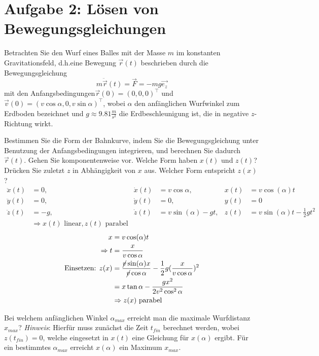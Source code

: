 \section*{Aufgabe 2:  Lösen von Bewegungsgleichungen}
Betrachten Sie den Wurf eines Balles mit der Masse $m$ im konstanten Gravitationsfeld, d.h.eine Bewegung $\overrightarrow{r}(t)$ beschrieben durch die Bewegungsgleichung \[m\ddot{\overrightarrow{r}}(t) = \overrightarrow{F} = -mg\overrightarrow{e_z}\] mit den Anfangsbedingungen$\overrightarrow{r}(0) = (0,0,0)^\top$ und $\overrightarrow{v}(0) = (v\cos\alpha,0,v\sin\alpha)^\top$, wobei $\alpha$ den anfänglichen Wurfwinkel zum Erdboden bezeichnet und $g\approx9.81\frac{m}{s^2}$ die Erdbeschleunigung ist, die in negative $z$-Richtung wirkt.
\begin{enumeralph}
	\item Bestimmen Sie die Form der Bahnkurve, indem Sie die Bewegungsgleichung unter Benutzung der Anfangsbedingungen integrieren, und berechnen Sie dadurch $\overrightarrow{r}(t)$.  Gehen Sie komponentenweise vor.  Welche Form haben $x(t)$ und $z(t)$?  Drücken Sie zuletzt $z$ in Abhängigkeit von $x$ aus.  Welcher Form entspricht $z(x)$?
	\begin{align*}
	\ddot{x}(t) &= 0,& \dot{x}(t) &= v \cos\alpha,&  x(t) &= v\cos(\alpha) t\\
	\ddot{y}(t) &= 0,& \dot{y}(t) &= 0,&  y(t) &= 0\\
	\ddot{z}(t) &= -g,& \dot{z}(t) &= v \sin(\alpha) - gt,&  z(t) &= v \sin(\alpha)t - \frac{1}{2}gt^2\\
	&\Rightarrow x(t) \text{ linear}, z(t) \text{ parabel}
	\end{align*}
	\begin{align*}
	x &= v\cos(\alpha)t\\
	\Rightarrow t &= \frac{x}{v\cos\alpha}\\
	\text{Einsetzen: } z(x) &= \frac{\cancel{v}\sin(\alpha)x}{\cancel{v}\cos\alpha}-\frac{1}{2}g(\frac{x}{v\cos\alpha})^2\\
	&=x\tan\alpha - \frac{gx^2}{2v^2\cos^2\alpha}\\
	&\Rightarrow z(x) \text{ parabel}
	\end{align*}
	\item Bei welchem anfänglichen Winkel $\alpha_{max}$ erreicht man die maximale Wurfdistanz $x_{max}$? \textit{Hinweis}:  Hierfür muss zunächst die Zeit $t_{fin}$ berechnet werden, wobei $z(t_{fin}) = 0$, welche eingesetzt in $x(t)$ eine Gleichung für $x(\alpha)$ ergibt.  Für ein bestimmtes $\alpha_{max}$ erreicht $x(\alpha)$ ein Maximum $x_{max}$.

\end{enumeralph}
